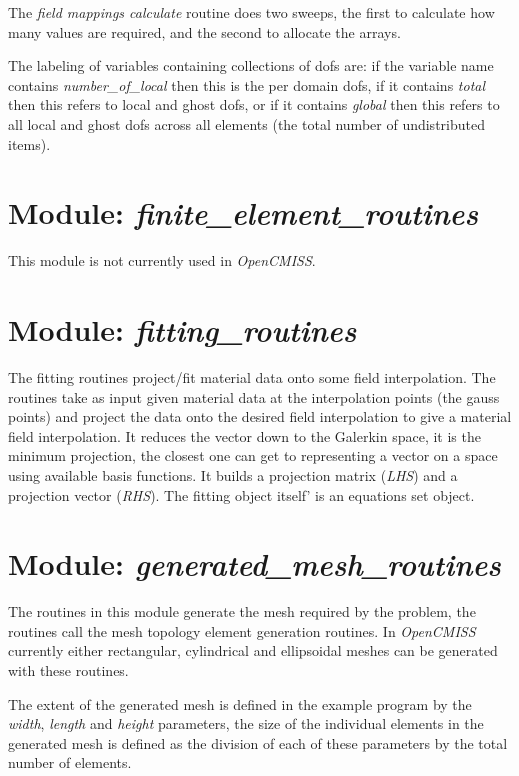 The \emph{field mappings calculate} routine does two sweeps, the first to calculate 
how many values are required, and the second to allocate the arrays.

The labeling of variables containing collections of dofs are: if the variable 
name contains \emph{number\_of\_local} then this is the per domain dofs, if it 
contains \emph{total} then this refers to local and ghost dofs, or if it contains 
\emph{global} then this refers to all local and ghost dofs across all elements (the 
total number of undistributed items).


\section{Module: \emph{finite\_element\_routines}}
\label{sec:finiteelementroutines}

This module is not currently used in \emph{OpenCMISS}.


\section{Module: \emph{fitting\_routines}}
\label{sec:fittingroutines}

The fitting routines project/fit material data onto some field interpolation.
The routines take as input given material data at the interpolation points (the
gauss points) and project the data onto the desired field interpolation to give
a material field interpolation. It reduces the vector down to the Galerkin
space, it is the minimum projection, the closest one can get to representing a 
vector on a space using available basis functions. It builds a projection
matrix (\emph{LHS}) and a projection vector (\emph{RHS}). The fitting object 
itself' is an equations set object.


\section{Module: \emph{generated\_mesh\_routines}}
\label{sec:generatedmeshroutines}

The routines in this module generate the mesh required by the problem, the 
routines call the mesh topology element generation routines. In 
\emph{OpenCMISS} currently either rectangular, cylindrical and ellipsoidal 
meshes can be generated with these routines.

The extent of the generated mesh is defined in the example program by the 
\emph{width}, \emph{length} and \emph{height} parameters, the size of the 
individual elements in the generated mesh is defined as the division of each 
of these parameters by the total number of elements.

